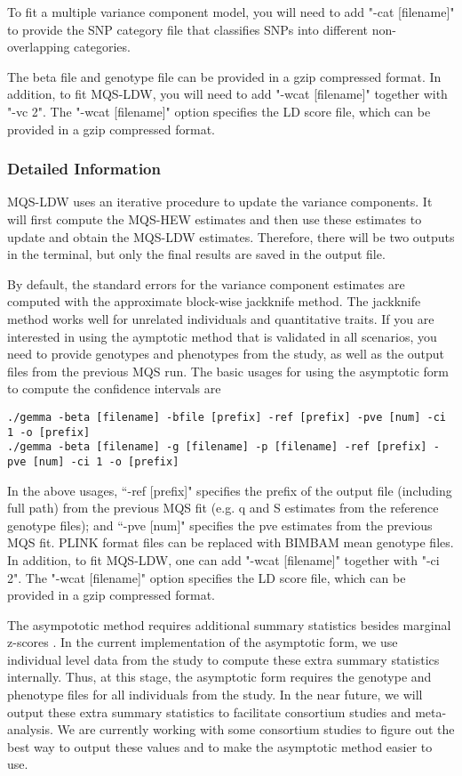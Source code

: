 \documentclass[11pt]{article}
\begin{document}
To fit a multiple variance component model, you will need to add "-cat [filename]" to provide the SNP category file that classifies SNPs into different non-overlapping categories. 

The beta file and genotype file can be provided in a gzip compressed format. In addition, to fit MQS-LDW, you will need to add "-wcat [filename]" together with "-vc 2". The "-wcat [filename]" option specifies the LD score file, which can be provided in a gzip compressed format.


\subsubsection{Detailed Information}
MQS-LDW uses an iterative procedure to update the variance components. It will first compute the MQS-HEW estimates and then use these estimates to update and obtain the MQS-LDW estimates. Therefore, there will be two outputs in the terminal, but only the final results are saved in the output file.

By default, the standard errors for the variance component estimates are computed with the approximate block-wise jackknife method.  The jackknife method works well for unrelated individuals and quantitative traits. If you are interested in using the aymptotic method that is validated in all scenarios, you need to provide genotypes and phenotypes from the study, as well as the output files from the previous MQS run. The basic usages for using the asymptotic form to compute the confidence intervals are
\begin{verbatim}
./gemma -beta [filename] -bfile [prefix] -ref [prefix] -pve [num] -ci 1 -o [prefix]
./gemma -beta [filename] -g [filename] -p [filename] -ref [prefix] -pve [num] -ci 1 -o [prefix]
\end{verbatim}
In the above usages, ``-ref [prefix]" specifies the prefix of the output file (including full path) from the previous MQS fit (e.g. q and S estimates from the reference genotype files); and ``-pve [num]" specifies the pve estimates from the previous MQS fit. PLINK format files can be replaced with BIMBAM mean genotype files. In addition, to fit MQS-LDW, one can add "-wcat [filename]" together with "-ci 2". The "-wcat [filename]" option specifies the LD score file, which can be provided in a gzip compressed format. 

The asympototic method requires additional summary statistics besides marginal z-scores \cite{Zhou:2016}. In the current implementation of the asymptotic form, we use individual level data from the study to compute these extra summary statistics internally. Thus, at this stage, the asymptotic form requires the genotype and phenotype files for all individuals from the study. In the near future, we will output these extra summary statistics to facilitate consortium studies and meta-analysis. We are currently working with some consortium studies to figure out the best way to output these values and to make the asymptotic method easier to use. 
\end{document}
